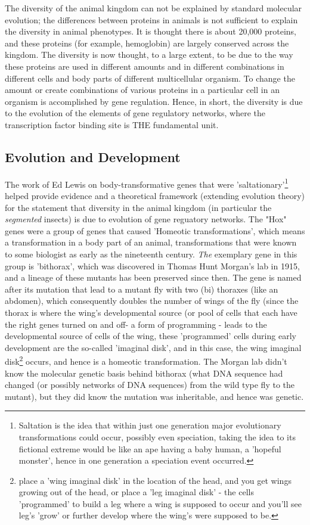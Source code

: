 The diversity of the animal kingdom can not be explained by standard molecular evolution; the differences between proteins in animals is not sufficient to explain the diversity in animal phenotypes\cite{pmid1090005}.  It is thought there is about 20,000 proteins, and these proteins (for example, hemoglobin) are largely conserved across the kingdom.  The diversity is now thought, to a large extent, to be due to the way these proteins are used in different amounts and in different combinations in different cells and body parts of different multicellular organism.  To change the amount or create combinations of various proteins in a particular cell in an organism is accomplished by gene regulation.  Hence, in short, the diversity is due to the evolution of the elements of gene regulatory networks, where the transcription factor binding site is THE fundamental unit.
\subsection{Evolution and Development}
The work of Ed Lewis on body-transformative genes that were 'saltationary'\footnote{Saltation is the idea that within just one generation major evolutionary transformations could occur, possibly even speciation, taking the idea to its fictional extreme would be like an ape having a baby human, a 'hopeful monster', hence in one generation a speciation event occurred.} helped provide evidence and a theoretical framework (extending evolution theory) for the statement that diversity in the animal kingdom (in particular the \textit{segmented} insects) is due to evolution of gene reguatory networks.  The "Hox" genes were a group of genes that caused 'Homeotic transformations', which means a transformation in a body part of an animal, transformations that were known to some biologist as early as the nineteenth century.  \textit{The} exemplary gene in this group is 'bithorax', which was discovered in Thomas Hunt Morgan's lab in 1915, and a lineage of these mutants has been preserved since then. The gene is named after its mutation that lead to a mutant fly with two (bi) thoraxes (like an abdomen), which consequently doubles the number of wings of the fly (since the thorax is where the wing's developmental source (or pool of cells that each have the right genes turned on and off- a form of programming - leads to the developmental source of cells of the wing, these 'programmed' cells during early development are the so-called 'imaginal disk', and in this case, the wing imaginal disk\footnote{place a 'wing imaginal disk' in the location of the head, and you get wings growing out of the head, or place a 'leg imaginal disk' - the cells 'programmed' to build a leg where a wing is supposed to occur and you'll see leg's 'grow' or further develop where the wing's were supposed to be.} occurs, and hence is a homeotic transformation.  The Morgan lab didn't know the molecular genetic basis behind bithorax (what DNA sequence had changed (or possibly networks of DNA sequences) from the wild type fly to the mutant), but they did know the mutation was inheritable, and hence was genetic.




